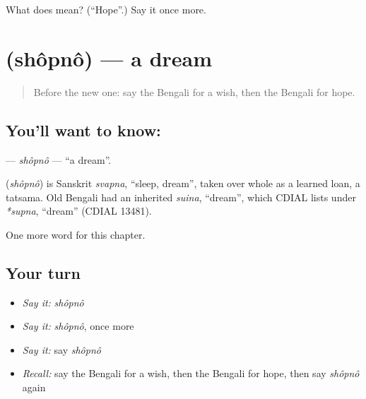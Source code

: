 \begin{tcolorbox}[breakable,colback=teal!4,colframe=teal!35!black,title={Before you move on}]
What does  mean? (\textquotedblleft{}Hope\textquotedblright{}.) Say it once more.
\end{tcolorbox}
\section[\texorpdfstring{\bn{স্বপ্ন} (shôpnô)}{স্বপ্ন (shôpnô)}]{ (shôpnô) — a dream}

\label{lesson:BN-C96-shopno}



\begin{quote}
Before the new one: say the Bengali for a wish, then the Bengali for hope.
\end{quote}

\subsection*{You'll want to know: }
\textbf{} — \emph{shôpnô} — \textquotedblleft{}a dream\textquotedblright{}.

\begin{cousinweb}
\textbf{} (\emph{shôpnô}) is Sanskrit \emph{svapna}, \textquotedblleft{}sleep, dream\textquotedblright{}, taken over whole as a learned loan, a tatsama. Old Bengali had an inherited \emph{suina}, \textquotedblleft{}dream\textquotedblright{}, which CDIAL lists under \emph{*supna}, \textquotedblleft{}dream\textquotedblright{} (CDIAL 13481).
\end{cousinweb}

\begin{grammarlens}[title={What you've built}]
One more word for this chapter.
\end{grammarlens}

\subsection*{Your turn}
\begin{itemize}
\raggedright
  \item \emph{Say it:} \emph{shôpnô}
  \item \emph{Say it:} \emph{shôpnô}, once more
  \item \emph{Say it:} say \emph{shôpnô}
  \item \emph{Recall:} say the Bengali for a wish, then the Bengali for hope, then say \emph{shôpnô} again
\end{itemize}

